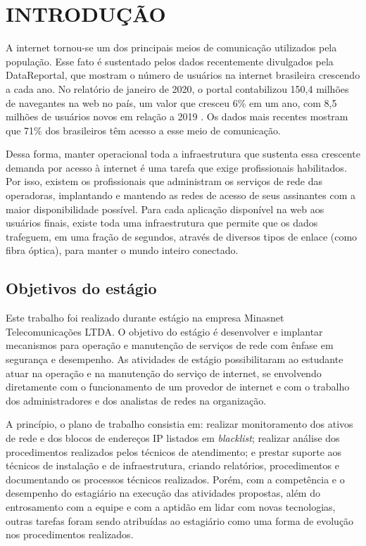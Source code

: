 \chapter{INTRODUÇÃO}

    A internet tornou-se um dos principais meios de comunicação utilizados pela população. Esse fato é sustentado pelos dados recentemente divulgados pela DataReportal, que mostram o número de usuários na internet brasileira crescendo a cada ano. No relatório de janeiro de 2020, o portal contabilizou 150,4 milhões de navegantes na web no país, um valor que cresceu 6\% em um ano, com 8,5 milhões de usuários novos em relação a 2019 \cite{datereportal2020}. Os dados mais recentes mostram que 71\% dos brasileiros têm acesso a esse meio de comunicação.
    
    Dessa forma, manter operacional toda a infraestrutura que sustenta essa crescente demanda por acesso à internet é uma tarefa que exige profissionais habilitados. Por isso, existem os profissionais que administram os serviços de rede das operadoras, implantando e mantendo as redes de acesso de seus assinantes com a maior disponibilidade possível. Para cada aplicação disponível na web aos usuários finais, existe toda uma infraestrutura que permite que os dados trafeguem, em uma fração de segundos, através de diversos tipos de enlace (como fibra óptica), para manter o mundo inteiro conectado.

\section{Objetivos do estágio}
    
    Este trabalho foi realizado durante estágio na empresa Minasnet Telecomunicações LTDA. O objetivo do estágio é desenvolver e implantar mecanismos para operação e manutenção de serviços de rede com ênfase em segurança e desempenho. As atividades de estágio possibilitaram ao estudante atuar na operação e na manutenção do serviço de internet, se envolvendo diretamente com o funcionamento de um provedor de internet e com o trabalho dos administradores e dos analistas de redes na organização.
    
    A princípio, o plano de trabalho consistia em: realizar monitoramento dos ativos de rede e dos blocos de endereços IP listados em \textit{blacklist}; realizar análise dos procedimentos realizados pelos técnicos de atendimento; e prestar suporte aos técnicos de instalação e de infraestrutura, criando relatórios, procedimentos e documentando os processos técnicos realizados. Porém, com a competência e o desempenho do estagiário na execução das atividades propostas, além do entrosamento com a equipe e com a aptidão em lidar com novas tecnologias, outras tarefas foram sendo atribuídas ao estagiário como uma forma de evolução nos procedimentos realizados.
    
